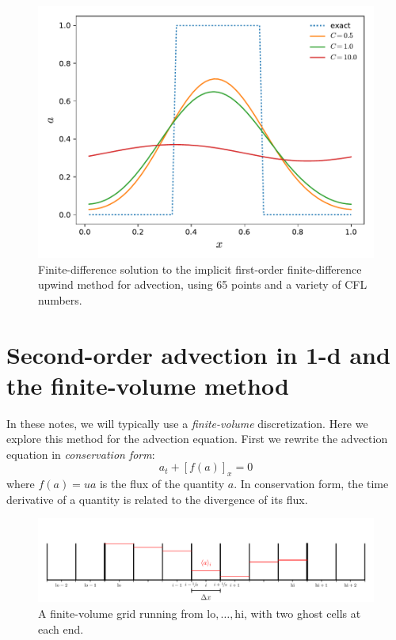 \begin{figure}[t]
\centering
\includegraphics[width=0.8\linewidth]{fdadvect-implicit}
\caption[First-order implicit finite-difference solution to linear advection]
{\label{fig:fdadvect-implicit} Finite-difference solution to the implicit first-order
finite-difference upwind method for advection, using 65 points and
a variety of CFL numbers. \\
}
\end{figure}


\section{Second-order advection in 1-d and the finite-volume method}

\label{ch:adv:sndorder}

In these notes, we will typically use a {\em finite-volume} discretization.  Here we 
explore this method for the 
advection equation.  First we rewrite the advection equation in {\em
  conservation form}:
\begin{equation}
a_t + \left[f(a)\right]_x = 0
\label{eq:advect-cons}
\end{equation}
where $f(a) = ua$ is the flux of the quantity $a$.  In conservation form,
the time derivative of a quantity is related to the divergence of 
its flux.

\begin{figure}[t]
\centering
\includegraphics[width=\linewidth]{fv_ghost}
\caption[A finite-volume grid with valid cells
  labeled]{\label{fig:fvghost} A finite-volume grid running from
  $\mathrm{lo}, \ldots, \mathrm{hi}$, with two ghost cells at each
  end.}
\end{figure}

